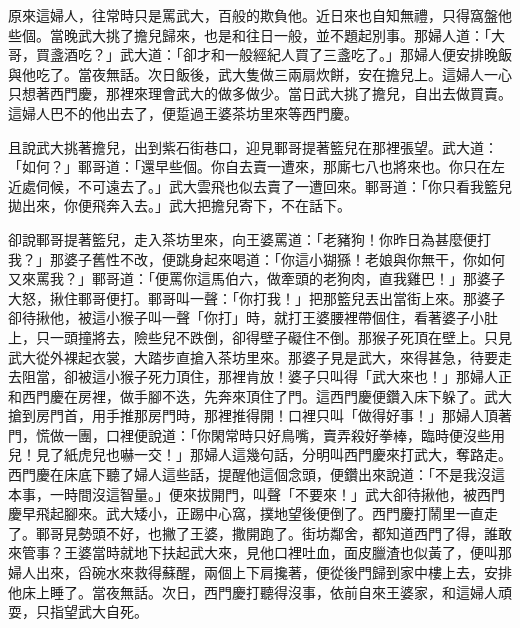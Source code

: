 原來這婦人，往常時只是罵武大，百般的欺負他。近日來也自知無禮，只得窩盤他些個。當晚武大挑了擔兒歸來，也是和往日一般，並不題起別事。那婦人道：「大哥，買盞酒吃？」武大道：「卻才和一般經紀人買了三盞吃了。」那婦人便安排晚飯與他吃了。當夜無話。次日飯後，武大隻做三兩扇炊餅，安在擔兒上。這婦人一心只想著西門慶，那裡來理會武大的做多做少。當日武大挑了擔兒，自出去做買賣。這婦人巴不的他出去了，便踅過王婆茶坊里來等西門慶。

且說武大挑著擔兒，出到紫石街巷口，迎見鄆哥提著籃兒在那裡張望。武大道：「如何？」鄆哥道：「還早些個。你自去賣一遭來，那廝七八也將來也。你只在左近處伺候，不可遠去了。」武大雲飛也似去賣了一遭回來。鄆哥道：「你只看我籃兒拋出來，你便飛奔入去。」武大把擔兒寄下，不在話下。

卻說鄆哥提著籃兒，走入茶坊里來，向王婆罵道：「老豬狗！你昨日為甚麼便打我？」那婆子舊性不改，便跳身起來喝道：「你這小猢猻！老娘與你無干，你如何又來罵我？」鄆哥道：「便罵你這馬伯六，做牽頭的老狗肉，直我雞巴！」那婆子大怒，揪住鄆哥便打。鄆哥叫一聲：「你打我！」把那籃兒丟出當街上來。那婆子卻待揪他，被這小猴子叫一聲「你打」時，就打王婆腰裡帶個住，看著婆子小肚上，只一頭撞將去，險些兒不跌倒，卻得壁子礙住不倒。那猴子死頂在壁上。只見武大從外裸起衣裳，大踏步直搶入茶坊里來。那婆子見是武大，來得甚急，待要走去阻當，卻被這小猴子死力頂住，那裡肯放！婆子只叫得「武大來也！」那婦人正和西門慶在房裡，做手腳不迭，先奔來頂住了門。這西門慶便鑽入床下躲了。武大搶到房門首，用手推那房門時，那裡推得開！口裡只叫「做得好事！」那婦人頂著門，慌做一團，口裡便說道：「你閑常時只好鳥嘴，賣弄殺好拳棒，臨時便沒些用兒！見了紙虎兒也嚇一交！」那婦人這幾句話，分明叫西門慶來打武大，奪路走。西門慶在床底下聽了婦人這些話，提醒他這個念頭，便鑽出來說道：「不是我沒這本事，一時間沒這智量。」便來拔開門，叫聲「不要來！」武大卻待揪他，被西門慶早飛起腳來。武大矮小，正踢中心窩，撲地望後便倒了。西門慶打鬧里一直走了。鄆哥見勢頭不好，也撇了王婆，撒開跑了。街坊鄰舍，都知道西門了得，誰敢來管事？王婆當時就地下扶起武大來，見他口裡吐血，面皮臘渣也似黃了，便叫那婦人出來，舀碗水來救得蘇醒，兩個上下肩攙著，便從後門歸到家中樓上去，安排他床上睡了。當夜無話。次日，西門慶打聽得沒事，依前自來王婆家，和這婦人頑耍，只指望武大自死。

